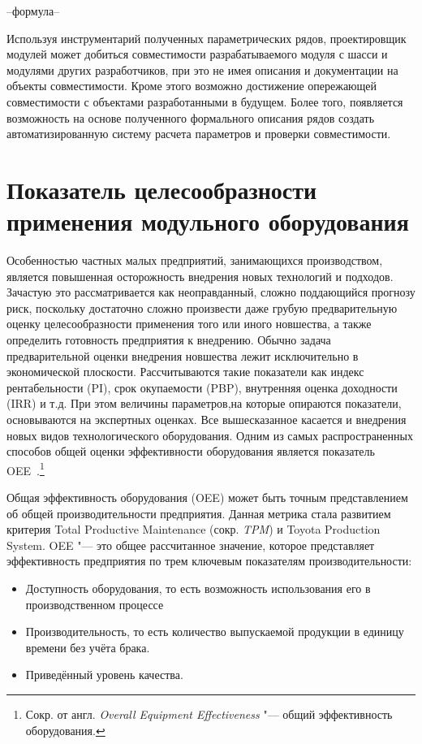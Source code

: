 --формула--

Используя инструментарий полученных параметрических рядов, проектировщик модулей может добиться совместимости разрабатываемого модуля с шасси и модулями других разработчиков, при это не имея описания и документации на объекты совместимости. Кроме этого возможно достижение опережающей совместимости с объектами разработанными в будущем. Более того, появляется возможность на основе полученного формального описания рядов создать автоматизированную систему расчета параметров и проверки совместимости.

\section{Показатель целесообразности применения модульного оборудования}

Особенностью частных малых предприятий, занимающихся производством, является повышенная осторожность внедрения новых технологий и подходов. Зачастую это рассматривается как неоправданный, сложно поддающийся прогнозу риск, поскольку достаточно сложно произвести даже грубую предварительную оценку целесообразности применения того или иного новшества, а также определить готовность предприятия к внедрению. Обычно задача предварительной оценки внедрения новшества лежит исключительно в экономической плоскости. Рассчитываются такие показатели как индекс рентабельности (PI), срок окупаемости (PBP), внутренняя оценка доходности (IRR) и т.\:д. При этом величины параметров,на которые опираются показатели,  основываются на экспертных оценках. Все вышесказанное касается и внедрения новых видов технологического оборудования. Одним из самых распространенных способов общей оценки эффективности оборудования является показатель OEE~\cite{oee}.\footnote{Сокр. от англ. \textit{Overall Equipment Effectiveness} "--- общий эффективность оборудования.}

Общая эффективность оборудования (OEE) может быть точным представлением об общей производительности предприятия. Данная метрика стала развитием критерия Total Productive Maintenance (сокр. \textit{TPM}) и  Toyota Production System. OEE "--- это общее рассчитанное значение, которое представляет эффективность предприятия по трем ключевым показателям производительности:

\begin{itemize}
	\item Доступность оборудования, то есть возможность использования его в производственном процессе
	\item Производительность, то есть количество выпускаемой продукции в единицу времени без учёта брака.
	\item Приведённый уровень качества. 
\end{itemize}


